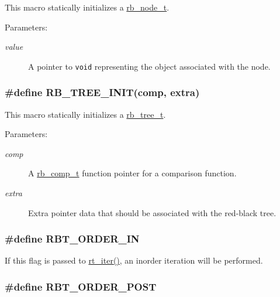 This macro statically initializes a \hyperlink{group__dbprim__rbtree_a1}{rb\_\-node\_\-t}.\begin{Desc}
\item[Parameters: ]\par
\begin{description}
\item[{\em 
value}]A pointer to {\tt void} representing the object associated with the node. \end{description}
\end{Desc}
\hypertarget{group__dbprim__rbtree_a14}{
\subsubsection[RB\_\-TREE\_\-INIT]{\setlength{\rightskip}{0pt plus 5cm}\#define RB\_\-TREE\_\-INIT(comp, extra)}}
\label{group__dbprim__rbtree_a14}


This macro statically initializes a \hyperlink{group__dbprim__rbtree_a0}{rb\_\-tree\_\-t}.\begin{Desc}
\item[Parameters: ]\par
\begin{description}
\item[{\em 
comp}]A \hyperlink{group__dbprim__rbtree_a3}{rb\_\-comp\_\-t} function pointer for a comparison function. \item[{\em 
extra}]Extra pointer data that should be associated with the red-black tree. \end{description}
\end{Desc}
\hypertarget{group__dbprim__rbtree_a22}{
\subsubsection[RBT\_\-ORDER\_\-IN]{\setlength{\rightskip}{0pt plus 5cm}\#define RBT\_\-ORDER\_\-IN}}
\label{group__dbprim__rbtree_a22}


If this flag is passed to \hyperlink{group__dbprim__rbtree_a11}{rt\_\-iter()}, an inorder iteration will be performed. \hypertarget{group__dbprim__rbtree_a23}{
\subsubsection[RBT\_\-ORDER\_\-POST]{\setlength{\rightskip}{0pt plus 5cm}\#define RBT\_\-ORDER\_\-POST}}
\label{group__dbprim__rbtree_a23}


